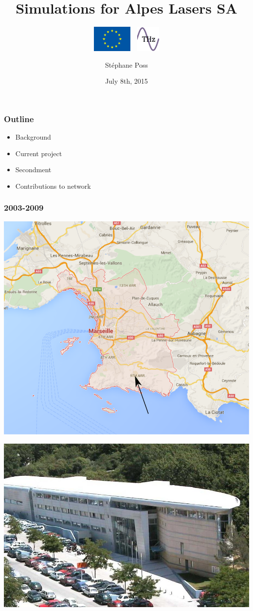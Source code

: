 \documentclass[14pt]{beamer}
\title{Simulations for Alpes Lasers SA}
\subtitle{\includegraphics[width=2cm]{europe}$\quad$\includegraphics[width=1.2cm]{notedev}}
\author{St\'ephane Poss}
\date{July 8th, 2015}
\begin{document}
\begin{frame}[plain]
\titlepage
\end{frame}

\begin{frame}
\frametitle{Outline}
\begin{itemize}
\item Background
\item Current project
\item Secondment
\item Contributions to network
\end{itemize}
\end{frame}

\begin{frame}
\frametitle{2003-2009}
\centering
\includegraphics[width=\textwidth]{marseille}
\end{frame}

\begin{frame}
\centering
\includegraphics[width=\textwidth]{CPPM_img1}
\end{frame}
\end{document}
